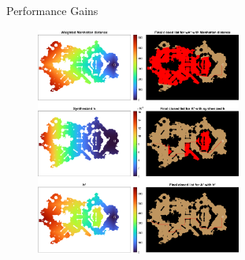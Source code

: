 \documentclass[aspectratio=169,usenames,dvipsnames]{beamer}
\renewcommand{\max}{\operatornamewithlimits{max}\limits}
\numberwithin{equation}{section}
\numberwithin{theorem}{section}
\numberwithin{lem}{section}
\numberwithin{df}{section}
\begin{document}
\begin{frame}{Performance Gains}

\begin{figure}[htbp]
\centering
\includegraphics[height=7.5cm]{figs/explainability3.png}
\label{fig:explainability3}
\end{figure}


\end{frame}


\end{document}
